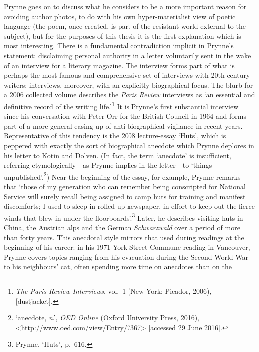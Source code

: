 \documentclass[]{article}
\begin{document}
Prynne goes on to discuss what he considers to be a more important
reason for avoiding author photos, to do with his own hyper-materialist
view of poetic language (the poem, once created, is part of the
resistant world external to the subject), but for the purposes of this
thesis it is the first explanation which is most interesting. There is a
fundamental contradiction implicit in Prynne's statement: disclaiming
personal authority in a letter voluntarily sent in the wake of an
interview for a literary magazine. The interview forms part of what is
perhaps the most famous and comprehensive set of interviews with
20th-century writers; interviews, moreover, with an explicitly
biographical focus. The blurb for a 2006 collected volume describes the
\emph{Paris Review} interviews as `an essential and definitive record of
the writing life.'\footnote{\emph{The Paris Review Interviews}, vol.~1
  (New York: Picador, 2006), {[}dustjacket{]}.} It is Prynne's first
substantial interview since his conversation with Peter Orr for the
British Council in 1964 and forms part of a more general easing-up of
anti-biographical vigilance in recent years. Representative of this
tendency is the 2008 lecture-essay `Huts', which is peppered with
exactly the sort of biographical anecdote which Prynne deplores in his
letter to Kotin and Dolven. (In fact, the term `anecdote' is
insufficient, referring etymologically---as Prynne implies in the
letter---to `things unpublished'.\footnote{`anecdote, \emph{n}.',
  \emph{OED Online} (Oxford University Press, 2016),
  \textless{}http://www.oed.com/view/Entry/7367\textgreater{}
  {[}accessed 29 June 2016{]}.}) Near the beginning of the essay, for
example, Prynne remarks that `those of my generation who can remember
being conscripted for National Service will surely recall being assigned
to camp huts for training and manifest discomforts; I used to sleep in
rolled-up newspaper, in effort to keep out the fierce winds that blew in
under the floorboards'.\footnote{Prynne, `Huts', p.~616.} Later, he
describes visiting huts in China, the Austrian alps and the German
\emph{Schwarzwald} over a period of more than forty years. This
anecdotal style mirrors that used during readings at the beginning of
his career: in his 1971 York Street Commune reading in Vancouver, Prynne
covers topics ranging from his evacuation during the Second World War to
his neighbours' cat, often spending more time on anecdotes than on the
\end{document}
